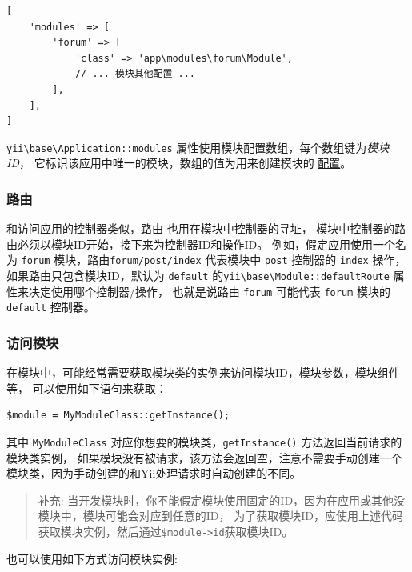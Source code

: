 \lstset{language=php}\begin{lstlisting}
[
    'modules' => [
        'forum' => [
            'class' => 'app\modules\forum\Module',
            // ... 模块其他配置 ...
        ],
    ],
]
\end{lstlisting}
\texttt{yii{\allowbreak{}\textbackslash}base{\allowbreak{}\textbackslash}Application\allowbreak{}::\allowbreak{}modules} 属性使用模块配置数组，每个数组键为\textit{模块 ID}，
它标识该应用中唯一的模块，数组的值为用来创建模块的 \hyperref[concept-configurations.md]{配置}。

\subsubsection{路由 \label{structure-modules.md::routes}}
和访问应用的控制器类似，\hyperref[structure-controllers.md::routes]{路由} 也用在模块中控制器的寻址，
模块中控制器的路由必须以模块ID开始，接下来为控制器ID和操作ID。
例如，假定应用使用一个名为 \lstinline|forum| 模块，路由\lstinline|forum/post/index| 代表模块中 \lstinline|post| 控制器的 \lstinline|index| 操作，
如果路由只包含模块ID，默认为 \lstinline|default| 的\texttt{yii{\allowbreak{}\textbackslash}base{\allowbreak{}\textbackslash}Module\allowbreak{}::\allowbreak{}defaultRoute} 属性来决定使用哪个控制器/操作，
也就是说路由 \lstinline|forum| 可能代表 \lstinline|forum| 模块的 \lstinline|default| 控制器。

\subsubsection{访问模块 \label{structure-modules.md::accessing-modules}}
在模块中，可能经常需要获取\hyperref[structure-modules.md::::module-classes]{模块类}的实例来访问模块ID，模块参数，模块组件等，
可以使用如下语句来获取：

\lstset{language=php}\begin{lstlisting}
$module = MyModuleClass::getInstance();
\end{lstlisting}
其中 \lstinline|MyModuleClass| 对应你想要的模块类，\lstinline|getInstance()| 方法返回当前请求的模块类实例，
如果模块没有被请求，该方法会返回空，注意不需要手动创建一个模块类，因为手动创建的和Yii处理请求时自动创建的不同。

\begin{quote}补充: 当开发模块时，你不能假定模块使用固定的ID，因为在应用或其他没模块中，模块可能会对应到任意的ID，
  为了获取模块ID，应使用上述代码获取模块实例，然后通过\lstinline|$module->id|获取模块ID。

\end{quote}
也可以使用如下方式访问模块实例:

